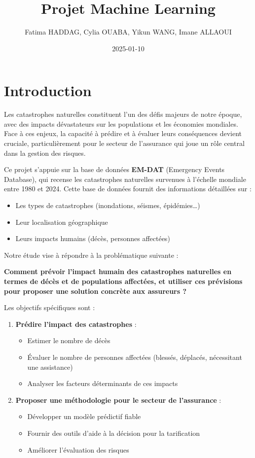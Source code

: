 \documentclass[
]{article}
\title{Projet Machine Learning}
\author{Fatima HADDAG, Cylia OUABA, Yikun WANG, Imane ALLAOUI}
\date{2025-01-10}
\providecommand{\tightlist}{%
  \setlength{\itemsep}{0pt}\setlength{\parskip}{0pt}}
\begin{document}
\maketitle

\section{Introduction}\label{introduction}

Les catastrophes naturelles constituent l'un des défis majeurs de notre
époque, avec des impacts dévastateurs sur les populations et les
économies mondiales. Face à ces enjeux, la capacité à prédire et à
évaluer leurs conséquences devient cruciale, particulièrement pour le
secteur de l'assurance qui joue un rôle central dans la gestion des
risques.

Ce projet s'appuie sur la base de données \textbf{EM-DAT} (Emergency
Events Database), qui recense les catastrophes naturelles survenues à
l'échelle mondiale entre 1980 et 2024. Cette base de données fournit des
informations détaillées sur :

\begin{itemize}
\item
  Les types de catastrophes (inondations, séismes, épidémies\ldots)
\item
  Leur localisation géographique
\item
  Leurs impacts humains (décès, personnes affectées)
\end{itemize}

Notre étude vise à répondre à la problématique suivante :

\textbf{Comment prévoir l'impact humain des catastrophes naturelles en
termes de décès et de populations affectées, et utiliser ces prévisions
pour proposer une solution concrète aux assureurs ?}

Les objectifs spécifiques sont :

\begin{enumerate}
\def\labelenumi{\arabic{enumi}.}
\tightlist
\item
  \textbf{Prédire l'impact des catastrophes} :

  \begin{itemize}
  \tightlist
  \item
    Estimer le nombre de décès
  \item
    Évaluer le nombre de personnes affectées (blessés, déplacés,
    nécessitant une assistance)
  \item
    Analyser les facteurs déterminants de ces impacts
  \end{itemize}
\item
  \textbf{Proposer une méthodologie pour le secteur de l'assurance} :

  \begin{itemize}
  \tightlist
  \item
    Développer un modèle prédictif fiable
  \item
    Fournir des outils d'aide à la décision pour la tarification
  \item
    Améliorer l'évaluation des risques
  \end{itemize}
\end{enumerate}
\end{document}
